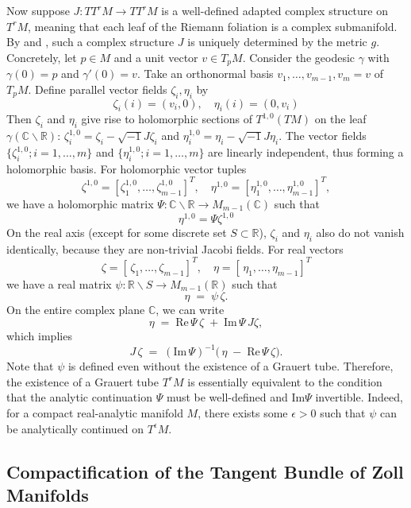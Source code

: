 \documentclass[a4paper, 12pt]{article}
\newcommand{\bC}{\mathbb{C}}
\newcommand{\bR}{\mathbb{R}}
\begin{document}
Now suppose $J:TT^rM\rightarrow TT^rM$ is a well-defined adapted complex structure on $T^rM$, meaning that each leaf of the Riemann foliation is a complex submanifold. By \cite{S91} and \cite{LS91}, such a complex structure $J$ is uniquely determined by the metric $g$. Concretely, let $p\in M$ and a unit vector $v\in T_pM$. Consider the geodesic $\gamma$ with $\gamma(0)=p$ and $\gamma'(0)=v$. Take an orthonormal basis $v_1,\dots,v_{m-1}, v_m=v$ of $T_pM$. Define parallel vector fields $\zeta_i,\eta_i$ by
\[
\zeta_i(i)=(v_i,0), 
\quad \eta_i(i)=(0,v_i)
\]
Then $\zeta_i$ and $\eta_i$ give rise to holomorphic sections of $T^{1,0}(TM)$ on the leaf $\gamma(\bC\backslash\bR)$: $\zeta_i^{1,0}=\zeta_i-\sqrt{-1}J\zeta_i$ and $\eta_i^{1,0}=\eta_i-\sqrt{-1}J\eta_i$. The vector fields $\{\zeta^{1,0}_i; i=1,\dots, m\}$ and $\{\eta^{1,0}_i; i=1,\dots, m\}$ are linearly independent, thus forming a holomorphic basis. For holomorphic vector tuples 
\[\zeta^{1,0}=[\zeta_1^{1,0},\dots,\zeta_{m-1}^{1,0}]^T,\quad \eta^{1,0}=[\eta_1^{1,0},\dots,\eta_{m-1}^{1,0}]^T,\]
we have a holomorphic matrix $\Psi:\bC\backslash\bR\rightarrow M_{m-1}(\bC)$ such that
\[
\eta^{1,0}=\Psi\zeta^{1,0}
\]
On the real axis (except for some discrete set $S\subset\bR$), $\zeta_i$ and $\eta_i$ also do not vanish identically, because they are non-trivial Jacobi fields. For real vectors
\[
\zeta=[\,\zeta_1,\dots,\zeta_{m-1}]^T, 
\quad \eta=[\,\eta_1,\dots,\eta_{m-1}]^T
\]
we have a real matrix $\psi:\bR\backslash S\rightarrow M_{m-1}(\bR)$ such that
\[
\eta \;=\; \psi\,\zeta.
\]
On the entire complex plane $\bC$, we can write
\[
\eta \;=\; \mathrm{Re}\,\Psi\,\zeta \;+\;\mathrm{Im}\,\Psi\,J\zeta,
\]
which implies
\[
J\,\zeta 
\;=\;
(\mathrm{Im}\,\Psi)^{-1}\bigl(\,\eta \;-\;\mathrm{Re}\,\Psi\,\zeta\bigr).
\]
Note that $\psi$ is defined even without the existence of a Grauert tube. Therefore, the existence of a Grauert tube $T^rM$ is essentially equivalent to the condition that the analytic continuation $\Psi$ must be well-defined and $\mathrm{Im} \Psi$ invertible. Indeed, for a compact real-analytic manifold $M$, there exists some $\epsilon>0$ such that $\psi$ can be analytically continued on $T^\epsilon M$.

\subsection{Compactification of the Tangent Bundle of Zoll Manifolds}\label{structure}

\end{document}
